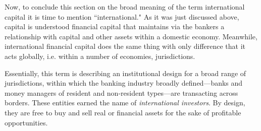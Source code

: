 Now, to conclude this section on the broad meaning of the term international capital it is time to mention ``international." As it was just discussed above, capital is understood financial capital that maintains via the bankers a relationship with capital and other assets within a domestic economy. Meanwhile, international financial capital does the same thing with only difference that it acts globally, i.e. within a number of economies, jurisdictions.

Essentially, this term is describing an institutional design for a broad range of jurisdictions, within which the banking industry broadly defined---banks and money managers of resident and non-resident types---are transacting across borders. These entities earned the name of \textit{international investors}. By design, they are free to buy and sell real or financial assets for the sake of profitable opportunities.

